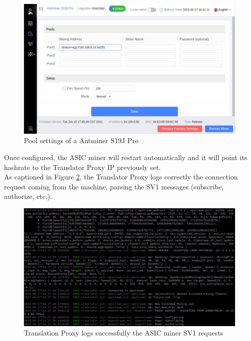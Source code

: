 \begin{itemize}
    \begin{figure}[h!]
    \centering
    \includegraphics[width=15cm]{Figures/sri/sri_miner.png}
    \caption{Pool settings of a Antminer S19J Pro}
    \label{fig:antminer}
    \end{figure}

    Once configured, the ASIC miner will restart automatically and it will point its hashrate to the Translator Proxy IP previously set.\\
    As captioned in Figure \ref{fig:sri_asic_proxy}, the Translator Proxy logs correctly the connection request coming from the machine, parsing the SV1 messages (subscribe, authorize, etc.).
    \begin{figure}[h!]
    \centering
    \includegraphics[width=15cm]{Figures/sri/sri_proxy.png}
    \caption{Translation Proxy logs successfully the ASIC miner SV1 requests}
    \label{fig:sri_asic_proxy}
    \end{figure}
    
\end{itemize}


